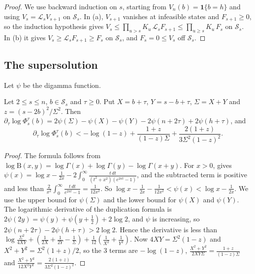 \begin{proof}
We use backward induction on $s$, starting from
$V_n(b)=\mathbf 1\{b=h\}$ and using $V_s=\mathcal L_sV_{s+1}$ on
$\mathcal S_s$. In (a), $V_{s+1}$ vanishes at infeasible states and
$F_{s+1}\ge0$, so the induction hypothesis gives
$V_s\le\prod_{u>s}K_u\,\mathcal L_sF_{s+1}\le\prod_{u\ge s}K_u\,F_s$ on
$\mathcal S_s$. In (b) it gives $V_s\ge\mathcal L_sF_{s+1}\ge F_s$ on
$\mathcal S_s$, and $F_s=0\le V_s$ off $\mathcal S_s$.
\end{proof}

\subsection{The supersolution}\label{app:erw-super}

Let $\psi$ be the digamma function.

\begin{lemma}\label{lem:A-cderiv}
Let $2\le s\le n$, $b\in\mathcal S_s$ and $\tau\ge0$. Put $X=b+\tau$,
$Y=s-b+\tau$, $\Sigma=X+Y$ and $z=(s-2b)^2/\Sigma^2$. Then
$\partial_\tau\log\Phi^\tau_s(b)=2\psi(\Sigma)-\psi(X)-\psi(Y)
-2\psi(n+2\tau)+2\psi(h+\tau)$, and
\[
 \partial_\tau\log\Phi^\tau_s(b)
 <-\log(1-z)+\frac{1+z}{(1-z)\Sigma}+\frac{2(1+z)}{3\Sigma^2(1-z)^2}.
\]
\end{lemma}

\begin{proof}
The formula follows from $\log\mathrm B(x,y)=\log\Gamma(x)+\log\Gamma(y)
-\log\Gamma(x+y)$. For $x>0$, \cite[5.9.15]{dlmf} gives
$\psi(x)=\log x-\frac1{2x}-2\int_0^\infty\frac{t\,dt}{(t^2+x^2)(e^{2\pi t}-1)}$,
and the subtracted term is positive and less than
$\frac2{x^2}\int_0^\infty\frac{t\,dt}{e^{2\pi t}-1}=\frac1{12x^2}$. So
$\log x-\frac1{2x}-\frac1{12x^2}<\psi(x)<\log x-\frac1{2x}$. We use the upper
bound for $\psi(\Sigma)$ and the lower bound for $\psi(X)$ and $\psi(Y)$. The
logarithmic derivative of the duplication formula \cite[5.5.5]{dlmf} is
$2\psi(2y)=\psi(y)+\psi(y+\frac12)+2\log2$, and $\psi$ is increasing, so
$2\psi(n+2\tau)-2\psi(h+\tau)>2\log2$. Hence the derivative is less than
$\log\frac{\Sigma^2}{4XY}+(\frac1{2X}+\frac1{2Y}-\frac1\Sigma)
+\frac1{12}(\frac1{X^2}+\frac1{Y^2})$. Now $4XY=\Sigma^2(1-z)$ and
$X^2+Y^2=\Sigma^2(1+z)/2$, so the 3 terms are $-\log(1-z)$,
$\frac{X^2+Y^2}{2XY\Sigma}=\frac{1+z}{(1-z)\Sigma}$ and
$\frac{X^2+Y^2}{12X^2Y^2}=\frac{2(1+z)}{3\Sigma^2(1-z)^2}$.
\end{proof}

